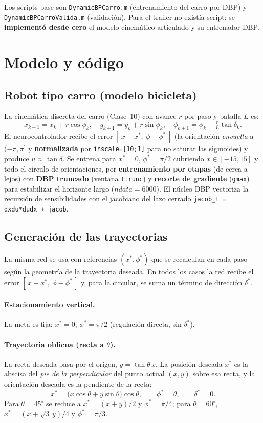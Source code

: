 \documentclass[11pt,a4paper]{article}
\newcommand{\code}[1]{\texttt{\small #1}}
\begin{document}
Los scripts base son \code{DynamicBPCarro.m} (entrenamiento del carro por DBP) y
\code{DynamicBPCarroValida.m} (validación). Para el trailer no existía script: se
\textbf{implementó desde cero} el modelo cinemático articulado y su entrenador DBP.

\section{Modelo y código}

\subsection{Robot tipo carro (modelo bicicleta)}
La cinemática discreta del carro (Clase~10) con avance $r$ por paso y batalla $L$ es:
\[
  x_{k+1}=x_k+r\cos\phi_k,\quad
  y_{k+1}=y_k+r\sin\phi_k,\quad
  \phi_{k+1}=\phi_k-\tfrac{r}{L}\tan\delta_k .
\]
El neurocontrolador recibe el error $[\,x-x^*,\ \phi-\phi^*\,]$ (la orientación
\emph{envuelta} a $(-\pi,\pi]$ y \textbf{normalizada} por \code{inscale=[10;1]} para no
saturar las sigmoides) y produce $u\approx\tan\delta$. Se entrena para $x^*=0$,
$\phi^*=\pi/2$ cubriendo $x\in[-15,15]$ y todo el círculo de orientaciones, por
\textbf{entrenamiento por etapas} (de cerca a lejos) con \textbf{DBP truncado} (ventana \code{Ttrunc})
y \textbf{recorte de gradiente} (\code{gmax}) para estabilizar el horizonte largo
($ndata=6000$). El núcleo DBP vectoriza la recursión de sensibilidades con el jacobiano
del lazo cerrado \code{jacob\_t = dxdu*dudx + jacob}.

\subsection{Generación de las trayectorias}
La misma red se usa con referencias $(x^*,\phi^*)$ que se recalculan en cada paso según
la geometría de la trayectoria deseada. En todos los casos la red recibe el error
$[\,x-x^*,\ \phi-\phi^*\,]$ y, para la circular, se suma un término de dirección
$\delta^*$.

\paragraph{Estacionamiento vertical.} La meta es fija: $x^*=0$, $\phi^*=\pi/2$
(regulación directa, sin $\delta^*$).

\paragraph{Trayectoria oblicua (recta a $\theta$).} La recta deseada pasa por el origen,
$y=\tan\theta\,x$. La posición deseada $x^*$ es la abscisa del \emph{pie de la
perpendicular} del punto actual $(x,y)$ sobre esa recta, y la orientación deseada es la
pendiente de la recta:
\[
  x^{*}=\big(x\cos\theta+y\sin\theta\big)\cos\theta, \qquad
  \phi^{*}=\theta, \qquad \delta^{*}=0 .
\]
Para $\theta=45^\circ$ se reduce a $x^{*}=(x+y)/2$ y $\phi^{*}=\pi/4$; para
$\theta=60^\circ$, $x^{*}=(x+\sqrt{3}\,y)/4$ y $\phi^{*}=\pi/3$.
\end{document}
